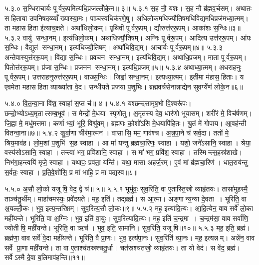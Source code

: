 ५.३.०
स॒न्धिराचार्यः पूर्वरू॒पमित्यधि॒प्रजल्लोँ॑के॒न॥ ३॥
५.३.१
स॒ह नौ॒ यशः। स॒ह नौ ब्र॑ह्मव॒र्चसम्। अथातः सहिताया उपनिषदव्व्याँख्यास्या॒मः। पञ्चस्वधिक॑रणे॒षु। अधिलोकमधिज्यौतिषमधिविद्यमधिप्रज॑मध्या॒त्मम्। ता महासहिता इ॑त्याच॒क्षते। अथा॑धिलो॒कम्। पृथिवी पूर्वरू॒पम्। द्यौरुत्त॑ररू॒पम्। आका॑शः स॒न्धिः॥३॥
५.३.२
वायु॑ सन्धा॒नम्। इत्य॑धिलो॒कम्। अथा॑धिज्यौ॒तिषम्। अग्निः पूर्वरू॒पम्। आदित्य उत्त॑ररू॒पम्। आ॑पः स॒न्धिः। वैद्युत॑ सन्धा॒नम्। इत्य॑धिज्यौ॒तिषम्। अथा॑धिवि॒द्यम्। आचार्यः पूर्वरू॒पम्॥४॥
५.३.३
अन्तेवास्युत्त॑ररू॒पम्। वि॑द्या स॒न्धिः। प्रवचन सन्धा॒नम्। इत्य॑धिवि॒द्यम्। अथाधि॒प्रजम्। माता पूर्वरू॒पम्। पितोत्त॑ररू॒पम्। प्र॑जा स॒न्धिः। प्रजनन सन्धा॒नम्। इत्यधि॒प्रजम्॥५॥
५.३.४
अथाध्या॒त्मम्। अधराहनुः पूर्वरू॒पम्। उत्तराहनुरुत्त॑ररू॒पम्। वाख्स॒न्धिः। जिह्वा॑ सन्धा॒नम्। इत्यध्या॒त्मम्। इतीमा म॑हास॒हिताः। य एवमेता महासहिता व्याख्या॑ता वे॒द। सन्धीयते प्रज॑या प॒शुभिः। ब्रह्मवर्चसेनान्नाद्येन सुवर्ग्येण॑ लोके॒न॥६॥
\anuvakamend

५.४.०
वि॒त॒न्वा॒ना वि॑श॒ स्वाहा॑ स॒प्त च॑॥ ४॥
५.४.१
यश्छन्द॑सामृष॒भो वि॒श्वरू॑पः। छन्दो॒भ्योऽध्य॒मृतात्सम्ब॒भूव॑। स मेन्द्रो॑ मे॒धया स्पृणोतु। अ॒मृत॑स्य देव॒ धार॑णो भूयासम्। शरी॑रं मे॒ विच॑र्\mbox{}षणम्। जि॒ह्वा मे॒ मधु॑मत्तमा। कर्णाभ्यां॒ भूरि॒ विश्रु॑वम्। ब्रह्म॑णः को॒शो॑ऽसि मे॒धयापि॑हितः। श्रु॒तं मे॑ गोपाय। आ॒वह॑न्ती वितन्वा॒ना॥७॥
५.४.२
कु॒र्वा॒णा चीर॑मा॒त्मन॑। वासासि॒ मम॒ गाव॑श्च। अ॒न्न॒पा॒ने च॑ सर्व॒दा। ततो॑ मे॒ श्रिय॒माव॑ह। लो॒म॒शां प॒शुभि॑ स॒ह स्वाहा। आ मा॑ यन्तु ब्रह्मचा॒रिणः॒ स्वाहा। यशो॒ जने॑ऽसानि॒ स्वाहा। श्रेया॒\an{} वस्य॑सोऽसानि॒ स्वाहा। तन्त्वा॑ भग॒ प्रवि॑शानि॒ स्वाहा। स मा॑ भग॒ प्रवि॑श॒ स्वाहा। तस्मिन्त्स॒हस्र॑शाखे। निभ॑गा॒हन्त्वयि॑ मृजे॒ स्वाहा। यथापः॒ प्रव॑ता॒ यन्ति॑। यथा॒ मासा॑ अहर्ज॒रम्। ए॒वं मां ब्र॑ह्मचा॒रिण॑। धात॒राय॑न्तु स॒र्वतः॒ स्वाहा। प्र॒ति॒वे॒शो॑सि॒ प्र मा॑ भाहि॒ प्र मा॑ पद्यस्व॥८॥
\anuvakamend

५.५.०
अ॒सौ लो॒को यजूषि॒ वेद॒ द्वे च॑॥ ५॥
५.५.१
भूर्भुवः॒ सुव॒रिति॒ वा ए॒तास्ति॒स्रो व्याहृ॑तयः। तासा॑मुहस्मै॒ ताञ्च॑तु॒र्थीम्। माहा॑चमस्यः॒ प्रवे॑दयते। मह॒ इति॑। तद्ब्रह्म॑। स आ॒त्मा। अङ्गान्य॒न्या दे॒वता। भूरिति॒ वा अ॒यल्लोँ॒कः। भुव॒ इत्य॒न्तरि॑क्षम्। सुव॒रित्य॒सौ लो॒कः॥९॥
५.५.२
मह॒ इत्या॑दि॒त्यः। आ॒दि॒त्येन॒ वाव सर्वे॑ लो॒का मही॑यन्ते। भूरिति॒ वा अ॒ग्निः। भुव॒ इति॑ वा॒युः। सुव॒रित्या॑दि॒त्यः। मह॒ इति॑ च॒न्द्रमा। च॒न्द्रम॑सा॒ वाव सर्वा॑णि॒ ज्योतीषि॒ मही॑यन्ते। भूरिति॒ वा ऋच॑। भुव॒ इति॒ सामा॑नि। सुव॒रिति॒ यजूषि॥१०॥
५.५.३
मह॒ इति॒ ब्रह्म॑। ब्रह्म॑णा॒ वाव सर्वे॑ वे॒दा मही॑यन्ते। भूरिति॒ वै प्रा॒णः। भुव॒ इत्य॑पा॒नः। सुव॒रिति॑ व्या॒नः। मह॒ इत्यन्नम्। अन्ने॑न॒ वाव सर्वे प्रा॒णा मही॑यन्ते। ता वा ए॒ताश्च॑तस्रश्चतु॒र्धा। चत॑स्रश्चतस्रो॒ व्याहृ॑तयः। ता यो वेद॑। स वे॑द॒ ब्रह्म॑। सर्वेऽस्मै दे॒वा ब॒लिमाव॑हन्ति॥११॥
\anuvakamend

